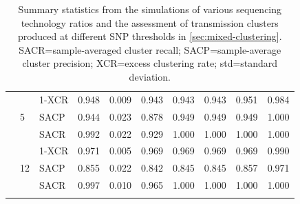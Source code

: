 \begin{longtable}[c]{|l|l|l|l|l|l|l|l|l|l|}
                        & \multirow{3}{*}{5}  & 1-XCR  & 0.948 & 0.009 & 0.943 & 0.943 & 0.943 & 0.951 & 0.984 \\ \cline{3-10} 
                        &                     & SACP   & 0.944 & 0.023 & 0.878 & 0.949 & 0.949 & 0.949 & 1.000 \\ \cline{3-10} 
                        &                     & SACR   & 0.992 & 0.022 & 0.929 & 1.000 & 1.000 & 1.000 & 1.000 \\ \cline{2-10} 
                        & \multirow{3}{*}{12} & 1-XCR  & 0.971 & 0.005 & 0.969 & 0.969 & 0.969 & 0.969 & 0.990 \\ \cline{3-10} 
                        &                     & SACP   & 0.855 & 0.022 & 0.842 & 0.845 & 0.845 & 0.857 & 0.971 \\ \cline{3-10} 
                        &                     & SACR   & 0.997 & 0.010 & 0.965 & 1.000 & 1.000 & 1.000 & 1.000 \\ \hline
\caption{Summary statistics from the simulations of various sequencing technology ratios and the assessment of transmission clusters produced at different SNP thresholds in \autoref{sec:mixed-clustering}. SACR=sample-averaged cluster recall; SACP=sample-average cluster precision; XCR=excess clustering rate; std=standard deviation.}
\label{tab:mixed-sims-full}\\
\end{longtable}
